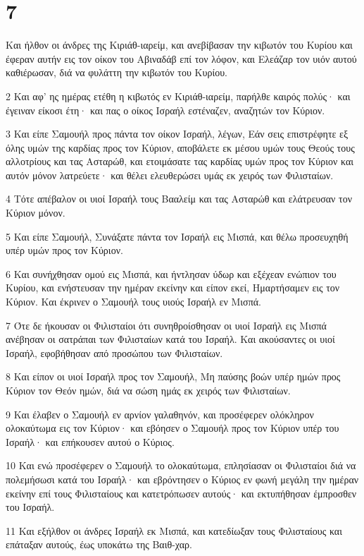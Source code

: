 \chapter{7}

\par Και ήλθον οι άνδρες της Κιριάθ-ιαρείμ, και ανεβίβασαν την κιβωτόν του Κυρίου και έφεραν αυτήν εις τον οίκον του Αβιναδάβ επί τον λόφον, και Ελεάζαρ τον υιόν αυτού καθιέρωσαν, διά να φυλάττη την κιβωτόν του Κυρίου.
\par 2 Και αφ' ης ημέρας ετέθη η κιβωτός εν Κιριάθ-ιαρείμ, παρήλθε καιρός πολύς· και έγειναν είκοσι έτη· και πας ο οίκος Ισραήλ εστέναζεν, αναζητών τον Κύριον.
\par 3 Και είπε Σαμουήλ προς πάντα τον οίκον Ισραήλ, λέγων, Εάν σεις επιστρέφητε εξ όλης υμών της καρδίας προς τον Κύριον, αποβάλετε εκ μέσου υμών τους Θεούς τους αλλοτρίους και τας Ασταρώθ, και ετοιμάσατε τας καρδίας υμών προς τον Κύριον και αυτόν μόνον λατρεύετε· και θέλει ελευθερώσει υμάς εκ χειρός των Φιλισταίων.
\par 4 Τότε απέβαλον οι υιοί Ισραήλ τους Βααλείμ και τας Ασταρώθ και ελάτρευσαν τον Κύριον μόνον.
\par 5 Και είπε Σαμουήλ, Συνάξατε πάντα τον Ισραήλ εις Μισπά, και θέλω προσευχηθή υπέρ υμών προς τον Κύριον.
\par 6 Και συνήχθησαν ομού εις Μισπά, και ήντλησαν ύδωρ και εξέχεαν ενώπιον του Κυρίου, και ενήστευσαν την ημέραν εκείνην και είπον εκεί, Ημαρτήσαμεν εις τον Κύριον. Και έκρινεν ο Σαμουήλ τους υιούς Ισραήλ εν Μισπά.
\par 7 Ότε δε ήκουσαν οι Φιλισταίοι ότι συνηθροίσθησαν οι υιοί Ισραήλ εις Μισπά ανέβησαν οι σατράπαι των Φιλισταίων κατά του Ισραήλ. Και ακούσαντες οι υιοί Ισραήλ, εφοβήθησαν από προσώπου των Φιλισταίων.
\par 8 Και είπον οι υιοί Ισραήλ προς τον Σαμουήλ, Μη παύσης βοών υπέρ ημών προς Κύριον τον Θεόν ημών, διά να σώση ημάς εκ χειρός των Φιλισταίων.
\par 9 Και έλαβεν ο Σαμουήλ εν αρνίον γαλαθηνόν, και προσέφερεν ολόκληρον ολοκαύτωμα εις τον Κύριον· και εβόησεν ο Σαμουήλ προς τον Κύριον υπέρ του Ισραήλ· και επήκουσεν αυτού ο Κύριος.
\par 10 Και ενώ προσέφερεν ο Σαμουήλ το ολοκαύτωμα, επλησίασαν οι Φιλισταίοι διά να πολεμήσωσι κατά του Ισραήλ· και εβρόντησεν ο Κύριος εν φωνή μεγάλη την ημέραν εκείνην επί τους Φιλισταίους και κατετρόπωσεν αυτούς· και εκτυπήθησαν έμπροσθεν του Ισραήλ.
\par 11 Και εξήλθον οι άνδρες Ισραήλ εκ Μισπά, και κατεδίωξαν τους Φιλισταίους και επάταξαν αυτούς, έως υποκάτω της Βαιθ-χαρ.
